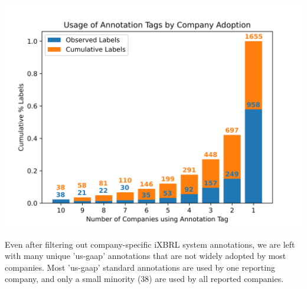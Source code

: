 \documentclass{article}
\begin{document}
\begin{center}
\includegraphics[width=\linewidth]{anno_coverage_vs_company_adoption.png}
\end{center}
Even after filtering out company-specific iXBRL system annotations, we are left with many unique 'us-gaap' annotations that are not widely adopted by most companies. Most 'us-gaap' standard annotations are used by one reporting company, and only a small minority (38) are used by all reported companies.
\end{document}
